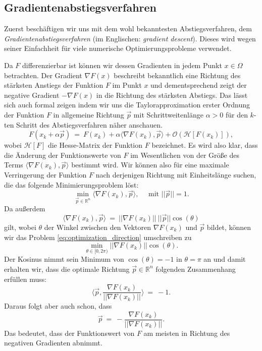\subsection{Gradientenabstiegsverfahren}
\label{ss:gradient_descent}
Zuerst beschäftigen wir uns mit dem wohl bekanntesten Abstiegsverfahren, dem \textit{Gradientenabstiegsverfahren} (im Englischen: \textit{gradient descent}). 
Dieses wird wegen seiner Einfachheit für viele numerische Optimierungsprobleme verwendet. 

Da $F$ differenzierbar ist können wir dessen Gradienten in jedem Punkt $x \in \Omega$ betrachten. 
Der Gradient $\nabla F(x)$ beschreibt bekanntlich eine Richtung des stärksten Anstiegs der Funktion $F$ im Punkt $x$ und dementsprechend zeigt der negative Gradient $-\nabla F(x)$ in die Richtung des stärksten Abstiegs.
Das lässt sich auch formal zeigen indem wir uns die Taylorapproximation erster Ordnung der Funktion $F$ in allgemeine Richtung $\vec{p}$ mit Schrittweitenlänge $\alpha > 0$ für den $k$-ten Schritt des Abstiegsverfahren näher anschauen.
\begin{equation*}
F(x_k + \alpha \vec{p}) \ = \ F(x_k) + \alpha \langle \nabla F(x_k), \vec{p} \rangle + \mathcal{O}(\mathcal{H}[F(x_k)]),
\end{equation*}
wobei $\mathcal{H}[F]$ die Hesse-Matrix der Funktion $F$ bezeichnet.
Es wird also klar, dass die Änderung der Funktionswerte von $F$ im Wesentlichen von der Größe des Terms $\langle \nabla F(x_k), \vec{p} \rangle$ bestimmt wird.
Wir können also für eine maximale Verringerung der Funktion $F$ nach derjenigen Richtung mit Einheitslänge suchen, die das folgende Minimierungsproblem löst:
\begin{equation}
\label{eq:optimization_direction}
\min_{\vec{p} \in \mathbb{R}^n} \langle \nabla F(x_k), \vec{p} \rangle, \quad \text{ mit } ||\vec{p}|| = 1. 
\end{equation}
Da außerdem
\begin{equation*}
 \langle \nabla F(x_k), \vec{p} \rangle \ = \ ||\nabla F(x_k)||~||\vec{p}|| \cos(\theta) 
\end{equation*}
gilt, wobei $\theta$ der Winkel zwischen den Vektoren $\nabla F(x_k)$ und $\vec{p}$ bildet, können wir das Problem \eqref{eq:optimization_direction} umschreiben zu
\begin{equation*}
\min_{\theta \in [0,2\pi)} ||\nabla F(x_k)|| \cos(\theta).
\end{equation*}
Der Kosinus nimmt sein Minimum von $\cos(\theta)=-1$ in $\theta = \pi$ an und damit erhalten wir, dass die optimale Richtung $\vec{p} \in \mathbb{R}^n$ folgenden Zusammenhang erfüllen muss:
\begin{equation*}
\langle \vec{p}, \frac{\nabla F(x_k)}{||\nabla F(x_k)||}\rangle \ = \ -1.
\end{equation*}
Daraus folgt aber auch schon, dass
\begin{equation}
\label{eq:optimal_direction}
\vec{p} \ = \ -\frac{\nabla F(x_k)}{||\nabla F(x_k)||}.
\end{equation}
Das bedeutet, dass der Funktionswert von $F$ am meisten in Richtung des negativen Gradienten abnimmt.

